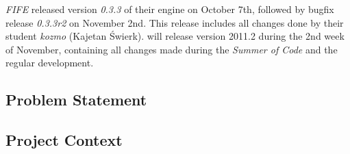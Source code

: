 \textit{FIFE} released version \textit{0.3.3} of their engine on October 7th,
followed by bugfix release \textit{0.3.3r2} on November 2nd. This release includes all changes done by their student
\textit{kozmo} (Kajetan Świerk). \UH{} will release \UH{} version 2011.2 during the 2nd week of November, containing all
changes made during the \textit{Summer of Code} and the regular development.









\subsection{Problem Statement}

\subsection{Project Context}


